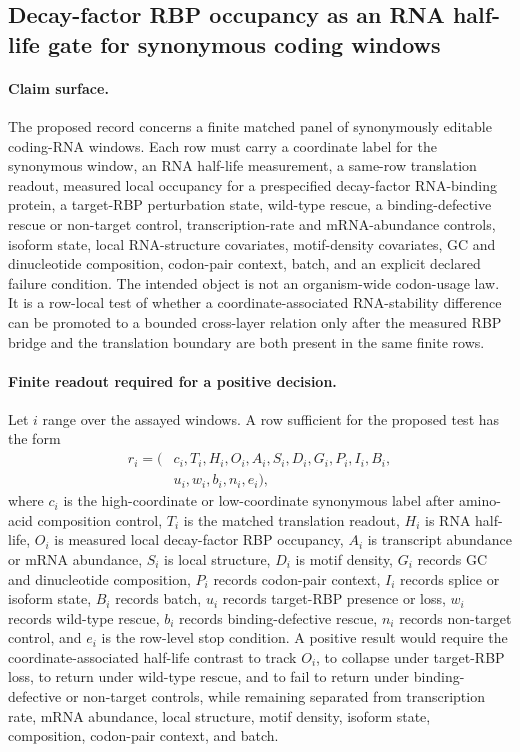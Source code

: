 \subsection{Decay-factor RBP occupancy as an RNA half-life gate for synonymous coding windows}\label{sec:bioreality-decay-factor-rbp-rna-half-life-translation-boundary}

\paragraph{Claim surface.} The proposed record concerns a finite matched panel of synonymously editable coding-RNA windows. Each row must carry a coordinate label for the synonymous window, an RNA half-life measurement, a same-row translation readout, measured local occupancy for a prespecified decay-factor RNA-binding protein, a target-RBP perturbation state, wild-type rescue, a binding-defective rescue or non-target control, transcription-rate and mRNA-abundance controls, isoform state, local RNA-structure covariates, motif-density covariates, GC and dinucleotide composition, codon-pair context, batch, and an explicit declared failure condition. The intended object is not an organism-wide codon-usage law. It is a row-local test of whether a coordinate-associated RNA-stability difference can be promoted to a bounded cross-layer relation only after the measured RBP bridge and the translation boundary are both present in the same finite rows.

\paragraph{Finite readout required for a positive decision.} Let $i$ range over the assayed windows. A row sufficient for the proposed test has the form
$$
\begin{aligned}
r_i = (&c_i, T_i, H_i, O_i, A_i, S_i, D_i, G_i, P_i, I_i, B_i,\\
       &u_i, w_i, b_i, n_i, e_i),
\end{aligned}
$$
where $c_i$ is the high-coordinate or low-coordinate synonymous label after amino-acid composition control, $T_i$ is the matched translation readout, $H_i$ is RNA half-life, $O_i$ is measured local decay-factor RBP occupancy, $A_i$ is transcript abundance or mRNA abundance, $S_i$ is local structure, $D_i$ is motif density, $G_i$ records GC and dinucleotide composition, $P_i$ records codon-pair context, $I_i$ records splice or isoform state, $B_i$ records batch, $u_i$ records target-RBP presence or loss, $w_i$ records wild-type rescue, $b_i$ records binding-defective rescue, $n_i$ records non-target control, and $e_i$ is the row-level stop condition. A positive result would require the coordinate-associated half-life contrast to track $O_i$, to collapse under target-RBP loss, to return under wild-type rescue, and to fail to return under binding-defective or non-target controls, while remaining separated from transcription rate, mRNA abundance, local structure, motif density, isoform state, composition, codon-pair context, and batch.

